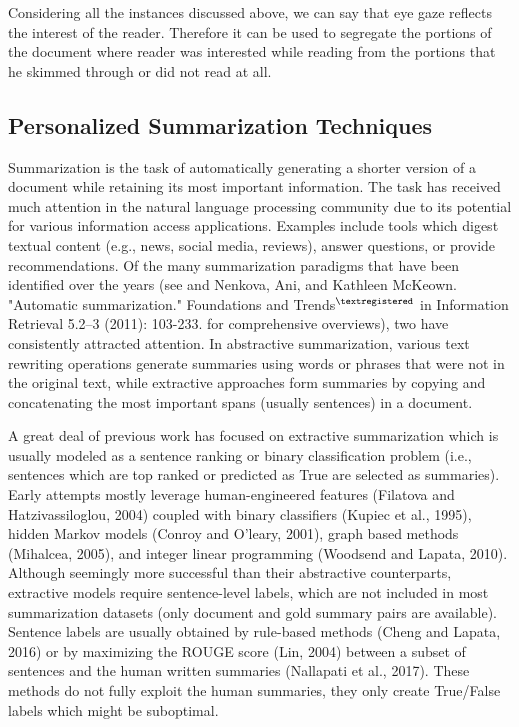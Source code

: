 \documentclass[12pt]{article}
\begin{document}
Considering all the instances discussed above, we can say that eye gaze reflects the interest of the reader. Therefore it can be used to segregate the portions of the document where reader was interested while reading from the portions that he skimmed through or did not read at all.


\subsection{Personalized Summarization Techniques}

Summarization is the task of automatically generating a shorter version of a document while retaining its most important information. The task has received much attention in the
natural language processing community due to its
potential for various information access applications. Examples include tools which digest textual
content (e.g., news, social media, reviews), answer
questions, or provide recommendations.
Of the many summarization paradigms that
have been identified over the years (see \cite{autoSum}
and {Nenkova, Ani, and Kathleen McKeown. "Automatic summarization." Foundations and Trends$^{\tiny{\textregistered}}$ in Information Retrieval 5.2–3 (2011): 103-233.}
for comprehensive overviews), two have consistently attracted
attention. In abstractive summarization, various
text rewriting operations generate summaries using words or phrases that were not in the original
text, while extractive approaches form summaries
by copying and concatenating the most important
spans (usually sentences) in a document. 


A great deal of previous work has focused
on extractive summarization which is usually modeled as a sentence ranking or binary classification problem (i.e., sentences
which are top ranked or predicted as True
are selected as summaries). Early attempts
mostly leverage human-engineered features
(Filatova and Hatzivassiloglou, 2004) coupled
with binary classifiers (Kupiec et al., 1995), hidden Markov models (Conroy and O’leary, 2001), graph based methods (Mihalcea, 2005), and integer linear programming (Woodsend and Lapata,
2010). Although seemingly more successful than their
abstractive counterparts, extractive models require
sentence-level labels, which are not included in
most summarization datasets (only document and
gold summary pairs are available). Sentence labels are usually obtained by rule-based methods (Cheng and Lapata, 2016) or by maximizing
the ROUGE score (Lin, 2004) between a subset
of sentences and the human written summaries
(Nallapati et al., 2017). These methods do not
fully exploit the human summaries, they only create True/False labels which might be suboptimal.
\end{document}
